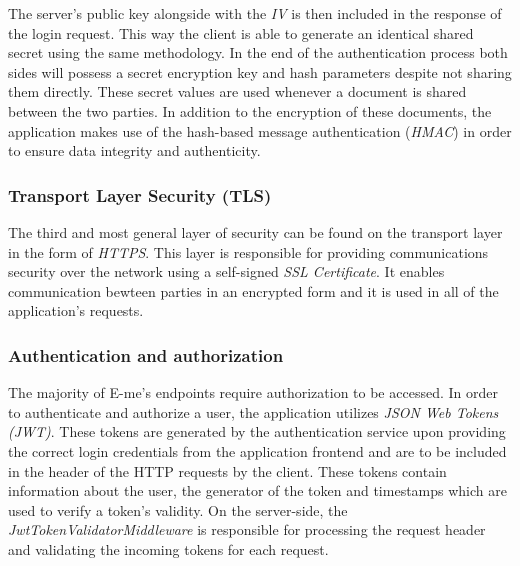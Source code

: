 The server's public key alongside with the \emph{IV} is then included in the response of the login request.
This way the client is able to generate an identical shared secret using the same methodology.
In the end of the authentication process both sides will possess a secret encryption key and hash parameters despite not sharing them directly.
These secret values are used whenever a document is shared between the two parties.
In addition to the encryption of these documents, the application makes use of the hash-based message authentication (\emph{HMAC}) in order to 
ensure data integrity and authenticity.

\subsubsection{Transport Layer Security (TLS)}

The third and most general layer of security can be found on the transport layer in the form of \emph{HTTPS}.
This layer is responsible for providing communications security over the network using a self-signed \emph{SSL Certificate}.
It enables communication bewteen parties in an encrypted form and it is used in all of the application's requests.

\subsubsection{Authentication and authorization}

The majority of E-me's endpoints require authorization to be accessed.
In order to authenticate and authorize a user, the application utilizes \emph{JSON Web Tokens (JWT)}.
These tokens are generated by the authentication service upon providing the correct login credentials from the application frontend and are to be
included in the header of the HTTP requests by the client.
These tokens contain information about the user, the generator of the token and timestamps which are used to verify a token's validity.
On the server-side, the \emph{JwtTokenValidatorMiddleware} is responsible for processing the request header and validating the incoming tokens for each request.